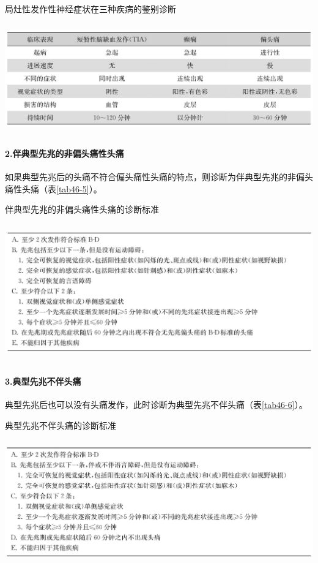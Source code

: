 \begin{table}[htbp]
\centering
\caption{局灶性发作性神经症状在三种疾病的鉴别诊断}
\label{tab46-4}
\includegraphics[width=5.91667in,height=1.85417in]{./images/Image00280.jpg}
\end{table}

\paragraph{2.伴典型先兆的非偏头痛性头痛}

如果典型先兆后的头痛不符合偏头痛性头痛的特点，则诊断为伴典型先兆的非偏头痛性头痛（表\ref{tab46-5}）。

\begin{table}[htbp]
\centering
\caption{伴典型先兆的非偏头痛性头痛的诊断标准}
\label{tab46-5}
\includegraphics[width=5.91667in,height=2.32292in]{./images/Image00281.jpg}
\end{table}

\paragraph{3.典型先兆不伴头痛}

典型先兆后也可以没有头痛发作，此时诊断为典型先兆不伴头痛（表\ref{tab46-6}）。

\begin{table}[htbp]
\centering
\caption{典型先兆不伴头痛的诊断标准}
\label{tab46-6}
\includegraphics[width=5.89583in,height=2.125in]{./images/Image00282.jpg}
\end{table}

